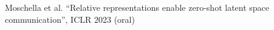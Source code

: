 \documentclass[preview]{standalone}
\begin{document}
\begin{center}
Moschella et al. “Relative representations enable zero-shot latent space communication”, ICLR 2023 (oral)
\end{center}
\end{document}
